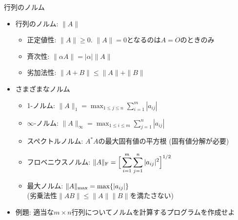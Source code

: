 \begin{frame}[t,fragile]{行列のノルム}
  \begin{itemize}
  \item 行列のノルム: $\| A \|$
    \begin{itemize}
    \item 正定値性: $\| A \| \ge 0$. $\| A \| = 0$となるのは$A=O$のときのみ
    \item 斉次性: $\| \alpha A \| = |\alpha| \| A \|$
    \item 劣加法性: $\| A+B \| \le \| A \| + \| B \|$
    \end{itemize}
  \item さまざまなノルム
    \begin{itemize}
    \item 1-ノルム: $\displaystyle \| A \|_1 = \max_{1 \le j \le n} \sum_{i=1}^m | a_{ij} |$
    \item $\infty$-ノルム: $\displaystyle \| A \|_\infty = \max_{1 \le i \le m} \sum_{j=1}^n | a_{ij} |$
    \item スペクトルノルム: $A^* A$の最大固有値の平方根 (固有値分解が必要)
    \item フロベニウスノルム: $\displaystyle \| A \|_{\rm F} = \Big[ \sum_{i=1}^m \sum_{j=1}^n |a_{ij}|^2 \Big]^{1/2}$
    \item 最大ノルム: $\displaystyle \| A \|_{\rm max} = \max \{ | a_{ij} | \}$ \\ (劣乗法性$\| AB \| \le \| A \| \| B \|$を満たさない)
    \end{itemize}
  \item 例題: 適当な$m \times n$行列についてノルムを計算するプログラムを作成せよ
  \end{itemize}
\end{frame}
